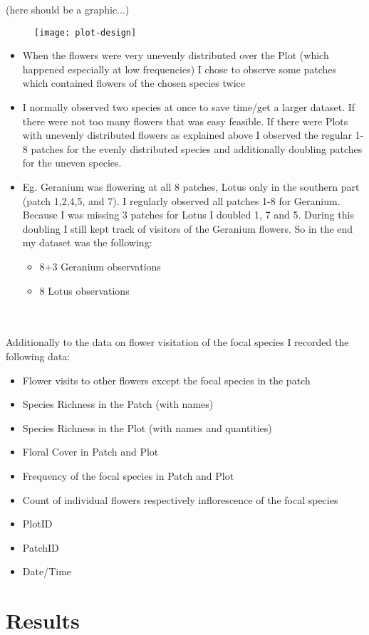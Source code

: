 \documentclass{article}
\begin{document}
(here should be a graphic...)

\begin{figure}
\texttt{[image: plot-design]}
\end{figure}


\begin{itemize}
\item When the flowers were very unevenly distributed over the Plot (which happened especially at low frequencies) I chose to observe some patches which contained flowers of the chosen species twice
\item I normally observed two species at once to save time/get a larger dataset. If there were not too many flowers that was easy feasible. If there were Plots with unevenly distributed flowers as explained above I observed the regular 1-8 patches for the evenly distributed species and additionally doubling patches for the uneven species. 
\item Eg. Geranium was flowering at all 8 patches, Lotus only in the southern part (patch 1,2,4,5, and 7). I regularly observed all patches 1-8 for Geranium. Because I was missing 3 patches for Lotus I doubled 1, 7 and 5. During this doubling I still kept track of visitors of the Geranium flowers. So in the end my dataset was the following:
\begin{itemize}
	\item 8+3 Geranium observations
	\item 8 Lotus observations
\end{itemize}
\end{itemize}

\\
\\


Additionally to the data on flower visitation of the focal species I recorded the following data:
\begin{itemize}
\item Flower visits to other flowers except the focal species in the patch
\item Species Richness in the Patch (with names)
\item Species Richness in the Plot (with names and quantities)
\item Floral Cover in Patch and Plot
\item Frequency of the focal species in Patch and Plot
\item Count of individual flowers respectively inflorescence of the focal species
\item PlotID
\item PatchID
\item Date/Time
\end{itemize}



\section{Results}
\end{document}
